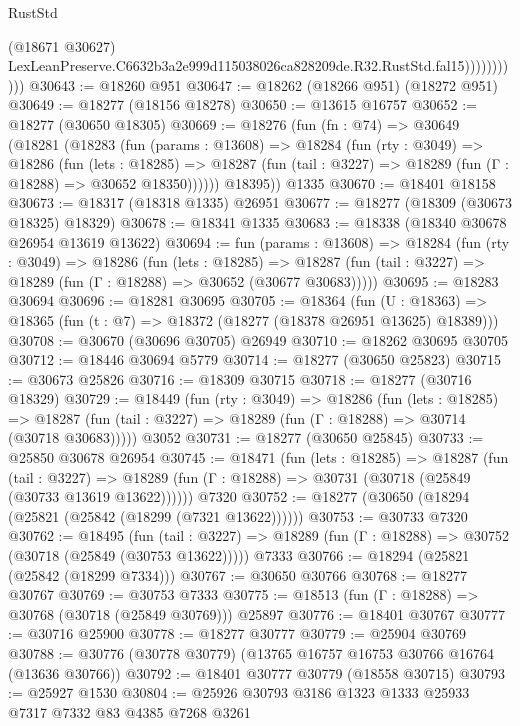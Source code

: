 \begin{lexlean}{RustStd}
\begin{coremodule}
                          (@18671 @30627)
                          LexLeanPreserve.C6632b3a2e999d115038026ca828209de.R32.RustStd.fal15)))))))))))
@30643 := @18260 @951
@30647 := @18262 (@18266 @951) (@18272 @951)
@30649 := @18277 (@18156 @18278)
@30650 := @13615 @16757
@30652 := @18277 (@30650 @18305)
@30669 := @18276
    (fun (fn : @74) =>
    @30649
      (@18281
        (@18283
          (fun (params : @13608) =>
          @18284
            (fun (rty : @3049) =>
            @18286
              (fun (lets : @18285) =>
              @18287 (fun (tail : @3227) => @18289 (fun (Γ : @18288) => @30652 @18350))))))
        @18395))
    @1335
@30670 := @18401 @18158
@30673 := @18317 (@18318 @1335) @26951
@30677 := @18277 (@18309 (@30673 @18325) @18329)
@30678 := @18341 @1335
@30683 := @18338 (@18340 @30678 @26954 @13619 @13622)
@30694 := fun (params : @13608) =>
  @18284
    (fun (rty : @3049) =>
    @18286
      (fun (lets : @18285) =>
      @18287 (fun (tail : @3227) => @18289 (fun (Γ : @18288) => @30652 (@30677 @30683)))))
@30695 := @18283 @30694
@30696 := @18281 @30695
@30705 := @18364
    (fun (U : @18363) => @18365 (fun (t : @7) => @18372 (@18277 (@18378 @26951 @13625) @18389)))
@30708 := @30670 (@30696 @30705) @26949
@30710 := @18262 @30695 @30705
@30712 := @18446 @30694 @5779
@30714 := @18277 (@30650 @25823)
@30715 := @30673 @25826
@30716 := @18309 @30715
@30718 := @18277 (@30716 @18329)
@30729 := @18449
    (fun (rty : @3049) =>
    @18286
      (fun (lets : @18285) =>
      @18287 (fun (tail : @3227) => @18289 (fun (Γ : @18288) => @30714 (@30718 @30683)))))
    @3052
@30731 := @18277 (@30650 @25845)
@30733 := @25850 @30678 @26954
@30745 := @18471
    (fun (lets : @18285) =>
    @18287
      (fun (tail : @3227) =>
      @18289 (fun (Γ : @18288) => @30731 (@30718 (@25849 (@30733 @13619 @13622))))))
    @7320
@30752 := @18277 (@30650 (@18294 (@25821 (@25842 (@18299 (@7321 @13622))))))
@30753 := @30733 @7320
@30762 := @18495
    (fun (tail : @3227) => @18289 (fun (Γ : @18288) => @30752 (@30718 (@25849 (@30753 @13622)))))
    @7333
@30766 := @18294 (@25821 (@25842 (@18299 @7334)))
@30767 := @30650 @30766
@30768 := @18277 @30767
@30769 := @30753 @7333
@30775 := @18513 (fun (Γ : @18288) => @30768 (@30718 (@25849 @30769))) @25897
@30776 := @18401 @30767
@30777 := @30716 @25900
@30778 := @18277 @30777
@30779 := @25904 @30769
@30788 := @30776 (@30778 @30779) (@13765 @16757 @16753 @30766 @16764 (@13636 @30766))
@30792 := @18401 @30777 @30779 (@18558 @30715)
@30793 := @25927 @1530
@30804 := @25926 @30793 @3186 @1323 @1333 @25933 @7317 @7332 @83 @4385 @7268 @3261

\end{coremodule}
\end{lexlean}
